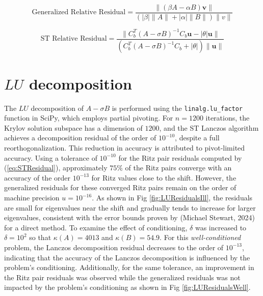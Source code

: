 \begin{equation}\label{eq:GeneralizedResidual}
\text{Generalized Relative Residual} = \frac{\| (\beta A - \alpha B)\mathbf{v} \| }{(\lvert \beta \rvert \|A\| + \lvert \alpha \rvert \|B\|)\|v\| }
\end{equation}

\begin{equation}\label{eq:STResidual}
\text{ST Relative Residual} = \frac{\| C_b^T(A - \sigma B)^{-1}C_b \mathbf{u} - \lvert \theta \rvert \mathbf{u} \| }{( C_b^T(A - \sigma B)^{-1}C_b + \lvert \theta \rvert)\|\mathbf{u}\| }
\end{equation}

\section{$LU$ decomposition}
The $LU$ decomposition of $A - \sigma B$ is performed using the \texttt{linalg.lu\_factor} function in SciPy, which employs partial pivoting. For $n = 1200$ iterations, the Krylov solution subspace has a dimension of $1200$, and the ST Lanczos algorithm achieves a decomposition residual of the order of $10^{-10}$, despite a full reorthogonalization. This reduction in accuracy is attributed to pivot-limited accuracy. Using a tolerance of $10^{-10}$ for the Ritz pair residuals computed by (\ref{eq:STResidual}), approximately $75\%$ of the Ritz pairs converge with an accuracy of the order $10^{-13}$ for Ritz values close to the shift. However, the generalized residuals for these converged Ritz pairs remain on the order of machine precision $u=10^{-16}$. As shown in Fig \ref{fig:LUResidualsIll}, the residuals are small for eigenvalues near the shift and gradually tends to increase for larger eigenvalues, consistent with the error bounds proven by (Michael Stewart, 2024) for a direct method. To examine the effect of conditioning, $\delta$ was increased to $\delta=10^2$ so that $\kappa(A) = 4013$ and $\kappa(B) = 54.9$. For this \textit{well-conditioned} problem, the Lanczos decomposition residual decreases to the order of $10^{-13}$, indicating that the accuracy of the Lanczos decomposition is influenced by the problem's conditioning. Additionally, for the same tolerance, an improvement in the Ritz pair residuals was observed  while the generalized residuals was not impacted by the problem's conditioning as shown in Fig \ref{fig:LUResidualsWell}.

